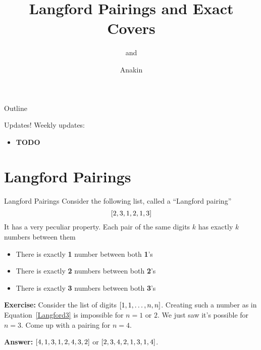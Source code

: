 \documentclass[aspectratio=169, handout]{beamer}
\title{Langford Pairings and Exact Covers}
\subtitle{\cite[Chapter~7]{TAOCP4A} and \cite[Chapter~7.2.2.1]{TAOCP4B}}
\author{Anakin}
\date{}
\begin{document}

\begin{frame}
\titlepage
\end{frame}

\begin{frame}{Outline}
  \tableofcontents
\end{frame}

\begin{frame}{Updates!}
  Weekly updates:
    \begin{itemize}
        \item \textbf{TODO}
    \end{itemize}
\end{frame}

\section{Langford Pairings}
\frame{\sectionpage}

\begin{frame}{Langford Pairings}
    Consider the following list, called a ``Langford pairing''
    \begin{equation}\label{Langford3}
        \bqty{2, 3, 1, 2, 1, 3}
    \end{equation}
    It has a very peculiar property. Each pair of the same digits $k$ has exactly $k$ numbers between them \pause
    \begin{itemize}
        \item There is exactly \textbf{1} number between both \textbf{1}'s
        \item There is exactly \textbf{2} numbers between both \textbf{2}'s
        \item There is exactly \textbf{3} numbers between both \textbf{3}'s
    \end{itemize} \pause
    \textcolor{sigma@alertred}{\textbf{Exercise:}} Consider the list of digits $\bqty{1, 1, \ldots, n, n}$. Creating such a number as in Equation~\ref{Langford3} is impossible for $n = 1$ or $2$. We just saw it's possible for $n = 3$. Come up with a pairing for $n = 4$.\pause 
    
    \textcolor{sigma@mainblue}{\textbf{Answer:}} $\bqty{4, 1, 3, 1, 2, 4, 3, 2}$ or $\bqty{2, 3, 4, 2, 1, 3, 1, 4}$.
\end{frame}
\end{document}
